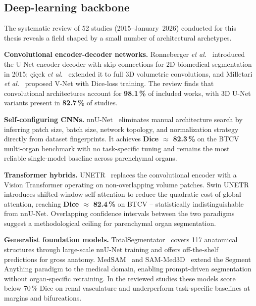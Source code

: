 \documentclass[a4paper,11pt,twoside]{article}
\begin{document}
\subsection{Deep-learning backbone}

The systematic review of 52 studies (2015--January~2026) conducted for this
thesis reveals a field shaped by a small number of architectural archetypes.

\textbf{Convolutional encoder-decoder networks.}
Ronneberger \textit{et al.}~\cite{ronneberger2015unet} introduced the U-Net
encoder-decoder with skip connections for 2D biomedical segmentation in 2015;
\c{c}i\c{c}ek \textit{et al.}~\cite{cicek20163dunet} extended it to full 3D
volumetric convolutions, and Milletari \textit{et al.}~\cite{milletari2016vnet}
proposed V-Net with Dice-loss training. The review finds that convolutional
architectures account for \textbf{98.1\,\%} of included works, with 3D U-Net
variants present in \textbf{82.7\,\%} of studies.

\textbf{Self-configuring CNNs.}
nnU-Net~\cite{isensee2021nnunet} eliminates manual architecture search by
inferring patch size, batch size, network topology, and normalization strategy
directly from dataset fingerprints.  It achieves \textbf{Dice $\approx$
82.3\,\%} on the BTCV multi-organ benchmark with no task-specific tuning and
remains the most reliable single-model baseline across parenchymal organs.

\textbf{Transformer hybrids.}
UNETR~\cite{hatamizadeh2022unetr} replaces the convolutional encoder with a
Vision Transformer operating on non-overlapping volume patches.
Swin UNETR~\cite{hatamizadeh2022swinunetr} introduces shifted-window
self-attention to reduce the quadratic cost of global attention, reaching
\textbf{Dice $\approx$ 82.4\,\%} on BTCV -- statistically indistinguishable
from nnU-Net.  Overlapping confidence intervals between the two paradigms
suggest a methodological ceiling for parenchymal organ segmentation.

\textbf{Generalist foundation models.}
TotalSegmentator~\cite{wasserthal2023totalsegmentator} covers 117 anatomical
structures through large-scale nnU-Net training and offers off-the-shelf
predictions for gross anatomy.  MedSAM~\cite{ma2024medsam} and
SAM-Med3D~\cite{wang2024sammed3d} extend the Segment Anything paradigm to
the medical domain, enabling prompt-driven segmentation without
organ-specific retraining.  In the reviewed studies these models score
below 70\,\% Dice on renal vasculature and underperform task-specific
baselines at margins and bifurcations.
\end{document}
